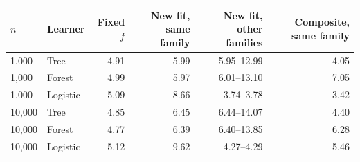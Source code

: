 \begin{tabular}{llrrrr}
\toprule
$n$ & Learner & Fixed $f$ & New fit, same family & New fit, other families & Composite, same family \\
\midrule
1,000 & Tree & 4.91 & 5.99 & 5.95--12.99 & 4.05 \\
1,000 & Forest & 4.99 & 5.97 & 6.01--13.10 & 7.05 \\
1,000 & Logistic & 5.09 & 8.66 & 3.74--3.78 & 3.42 \\
10,000 & Tree & 4.85 & 6.45 & 6.44--14.07 & 4.40 \\
10,000 & Forest & 4.77 & 6.39 & 6.40--13.85 & 6.28 \\
10,000 & Logistic & 5.12 & 9.62 & 4.27--4.29 & 5.46 \\
\bottomrule
\end{tabular}
